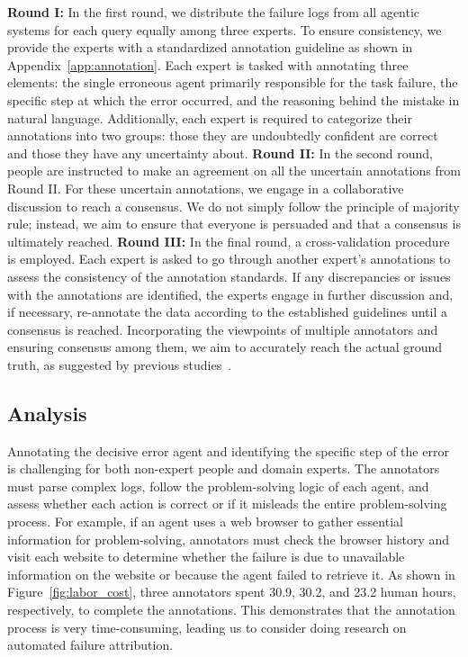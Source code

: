 \textbf{Round I:} In the first round, we distribute the failure logs from all agentic systems for each query equally among three experts. To ensure consistency, we provide the experts with a standardized annotation guideline as shown in Appendix~\ref{app:annotation}. Each expert is tasked with annotating three elements: the single erroneous agent primarily responsible for the task failure, the specific step at which the error occurred, and the reasoning behind the mistake in natural language. 
Additionally, each expert is required to categorize their annotations into two groups: those they are undoubtedly confident are correct and those they have any uncertainty about.
\textbf{Round II:} In the second round, people are instructed to make an agreement on all the uncertain annotations from Round II. For these uncertain annotations, we engage in a collaborative discussion to reach a consensus. We do not simply follow the principle of majority rule; instead, we aim to ensure that everyone is persuaded and that a consensus is ultimately reached.
\textbf{Round III:} In the final round, a cross-validation procedure is employed. Each expert is asked to go through another expert's annotations to assess the consistency of the annotation standards. If any discrepancies or issues with the annotations are identified, the experts engage in further discussion and, if necessary, re-annotate the data according to the established guidelines until a consensus is reached. Incorporating the viewpoints of multiple annotators and ensuring consensus among them, we aim to accurately reach the actual ground truth, as suggested by previous studies~\citep{clemen1989combining,zhuge2024agent}.

\subsection{Analysis}
\label{sec:dataset_analysis}

Annotating the decisive error agent and identifying the specific step of the error is challenging for both non-expert people and domain experts. The annotators must parse complex logs, follow the problem-solving logic of each agent, and assess whether each action is correct or if it misleads the entire problem-solving process.
For example, if an agent uses a web browser to gather essential information for problem-solving, annotators must check the browser history and visit each website to determine whether the failure is due to unavailable information on the website or because the agent failed to retrieve it.
As shown in Figure~\ref{fig:labor_cost}, three annotators spent 30.9, 30.2, and 23.2 human hours, respectively, to complete the annotations. This demonstrates that the annotation process is very time-consuming, leading us to consider doing research on automated failure attribution.

